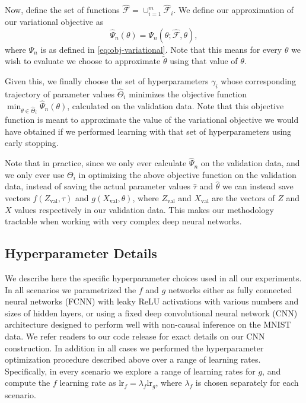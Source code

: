\documentclass{article}
\theoremstyle{plain}
\theoremstyle{definition}
\begin{document}
Now, define the set of functions $\hat{\mathcal{F}} = \cup_{i=1}^m \hat{\mathcal{F}}_i$. We define our approximation of our variational objective as 
\begin{equation*}
\hat \Psi_n(\theta) = \Psi_n(\theta; \hat{\mathcal{F}}, \theta),
\end{equation*}
where $\Psi_n$ is as defined in \cref{eq:obj-variational}. Note that this means for every $\theta$ we wish to evaluate we choose to approximate $\tilde \theta$ using that value of $\theta$.

Given this, we finally choose the set of hyperparameters $\gamma_i$ whose corresponding trajectory of parameter values $\hat{\Theta}_i$ minimizes the objective function $\min_{\theta \in \hat{\Theta}_i} \hat \Psi_n(\theta)$, calculated on the validation data. Note that this objective function is meant to approximate the value of the variational objective we would have obtained if we performed learning with that set of hyperparameters using early stopping.

Note that in practice, since we only ever calculate $\hat \Psi_n$ on the validation data, and we only ever use $\Theta_i$ in optimizing the above objective function on the validation data, instead of saving the actual parameter values $\hat \tau$ and $\hat \theta$ we can instead save vectors $f(Z_{\text{val}}, \tau)$ and $g(X_{\text{val}}, \theta)$, where $Z_{\text{val}}$ and $X_{\text{val}}$ are the vectors of $Z$ and $X$ values respectively in our validation data. This makes our methodology tractable when working with very complex deep neural networks.

\subsection{Hyperparameter Details}
\label{apx:hyperparameters}

We describe here the specific hyperparameter choices used in all our experiments. In all scenarios we parametrized the $f$ and $g$ networks either as fully connected neural networks (FCNN) with leaky ReLU activations with various numbers and sizes of hidden layers, or using a fixed deep convolutional neural network (CNN) architecture designed to perform well with non-causal inference on the MNIST data. We refer readers to our code release for exact details on our CNN construction. In addition in all cases we performed the hyperparameter optimization procedure described above over a range of learning rates. Specifically, in every scenario we explore a range of learning rates for $g$, and compute the $f$ learning rate as $\text{lr}_f = \lambda_f \text{lr}_g$, where $\lambda_f$ is chosen separately for each scenario.
\end{document}
